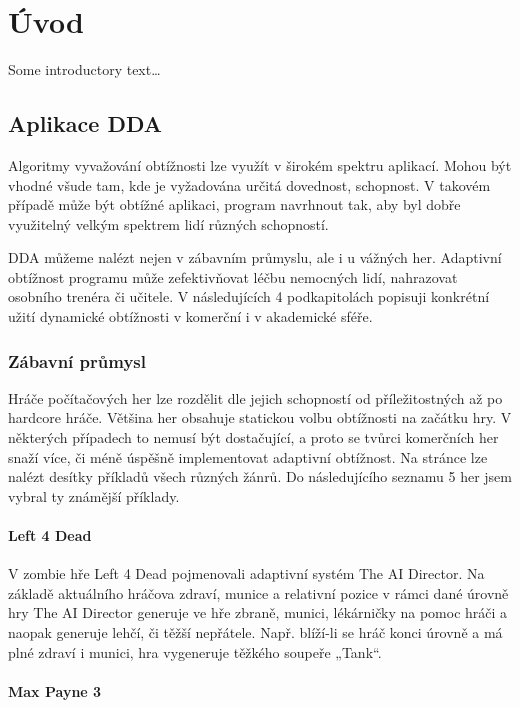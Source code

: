 \chapter{Úvod}
Some introductory text\dots

\section{Aplikace DDA}
Algoritmy vyvažování obtížnosti lze využít v širokém spektru aplikací. Mohou být vhodné všude tam, kde je vyžadována určitá dovednost, schopnost. V takovém případě může být obtížné aplikaci, program navrhnout tak, aby byl dobře využitelný velkým spektrem lidí různých schopností.

DDA můžeme nalézt nejen v zábavním průmyslu, ale i u vážných her. Adaptivní obtížnost programu může zefektivňovat léčbu nemocných lidí, nahrazovat osobního trenéra či učitele. V následujících 4 podkapitolách popisuji konkrétní užití dynamické obtížnosti v komerční i v akademické sféře.

\subsection{Zábavní průmysl}

Hráče počítačových her lze rozdělit dle jejich schopností od příležitostných až po hardcore hráče. Většina her obsahuje statickou volbu obtížnosti na začátku hry. V některých případech to nemusí být dostačující, a proto se tvůrci komerčních her snaží více, či méně úspěšně implementovat adaptivní obtížnost.
Na stránce \cite{1} lze nalézt desítky příkladů všech různých žánrů. Do následujícího seznamu 5 her jsem vybral ty známější příklady.


\subsubsection{Left 4 Dead}
\label{sec:Left4Dead}

V zombie hře Left 4 Dead pojmenovali adaptivní systém The AI Director. Na základě aktuálního hráčova zdraví, munice a relativní pozice v rámci dané úrovně hry The AI Director generuje ve hře zbraně, munici, lékárničky na pomoc hráči a naopak generuje lehčí, či těžší nepřátele. Např. blíží-li se hráč konci úrovně a má plné zdraví i munici, hra vygeneruje těžkého soupeře „Tank“. \cite{2}

\subsubsection{Max Payne 3}

